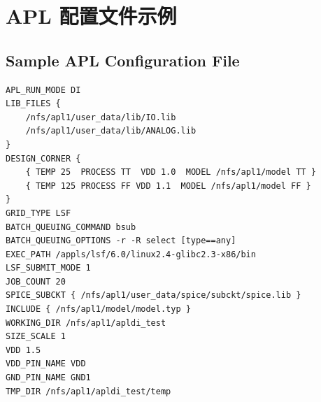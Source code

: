 \section{APL 配置文件示例}
\subsection*{Sample APL Configuration File}

\begin{lstlisting}
APL_RUN_MODE DI
LIB_FILES {
    /nfs/apl1/user_data/lib/IO.lib
    /nfs/apl1/user_data/lib/ANALOG.lib
}
DESIGN_CORNER {
    { TEMP 25  PROCESS TT  VDD 1.0  MODEL /nfs/apl1/model TT }
    { TEMP 125 PROCESS FF VDD 1.1  MODEL /nfs/apl1/model FF }
}
GRID_TYPE LSF
BATCH_QUEUING_COMMAND bsub
BATCH_QUEUING_OPTIONS -r -R select [type==any]
EXEC_PATH /appls/lsf/6.0/linux2.4-glibc2.3-x86/bin
LSF_SUBMIT_MODE 1
JOB_COUNT 20
SPICE_SUBCKT { /nfs/apl1/user_data/spice/subckt/spice.lib }
INCLUDE { /nfs/apl1/model/model.typ }
WORKING_DIR /nfs/apl1/apldi_test
SIZE_SCALE 1
VDD 1.5
VDD_PIN_NAME VDD
GND_PIN_NAME GND1
TMP_DIR /nfs/apl1/apldi_test/temp
\end{lstlisting}
